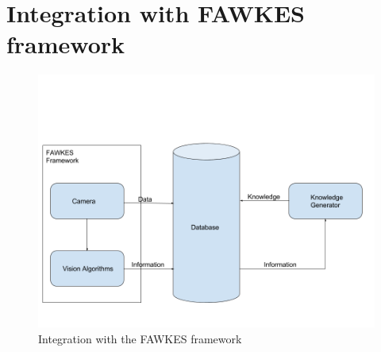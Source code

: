 \chapter{Integration with FAWKES framework}
\label{cha:}
\begin{figure}[htp]
\centering
\includegraphics[width=\textwidth]{images/integration.png}
\caption{Integration with the FAWKES framework}
\label{}
\end{figure}

